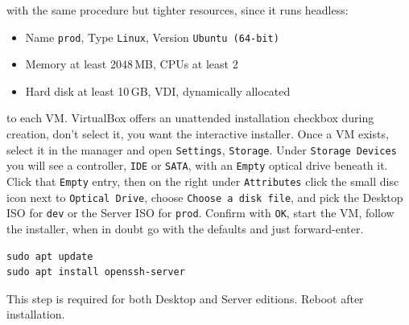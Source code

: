  with the same procedure but tighter resources, since it runs headless:
\begin{itemize}
    \item Name \texttt{prod}, Type \texttt{Linux}, Version \texttt{Ubuntu (64-bit)}
    \item Memory at least 2048\,MB, CPUs at least 2
    \item Hard disk at least 10\,GB, VDI, dynamically allocated
\end{itemize}


 to each VM. VirtualBox offers an unattended installation checkbox during creation, don't select it, 
you want the interactive installer. Once a VM exists, select it in the manager and open \texttt{Settings}, \texttt{Storage}. Under \texttt{Storage Devices} you will see a controller, \texttt{IDE} or \texttt{SATA}, with an \texttt{Empty} optical drive beneath it. Click that \texttt{Empty} entry, then on the right under \texttt{Attributes} click the small disc icon next to \texttt{Optical Drive}, choose \texttt{Choose a disk file}, and pick the Desktop ISO for \texttt{dev} or the Server ISO for \texttt{prod}. Confirm with \texttt{OK}, start the VM, follow the installer, when in doubt go with the defaults and just forward-enter.


\begin{verbatim}
sudo apt update
sudo apt install openssh-server
\end{verbatim}
This step is required for both Desktop and Server editions. Reboot after installation.



